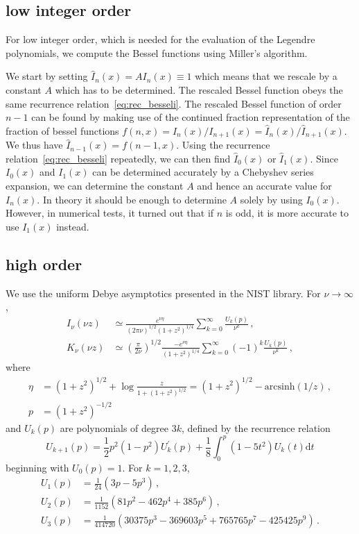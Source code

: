 \documentclass[onecolumn%
              ,superscriptaddress%
              ,aps%
              ,pra]{revtex4}
\begin{document}
\subsection{low integer order}
For low integer order, which is needed for the evaluation of the Legendre polynomials, we compute the Bessel functions using Miller's algorithm.

We start by setting $\hat{I}_n(x)=A I_n(x)\equiv 1$ which means that we rescale by a constant $A$ which has to be determined. The rescaled Bessel function obeys the same recurrence relation~\eqref{eq:rec_besseli}. The rescaled Bessel function of order $n-1$ can be found by making use of the continued fraction representation of the fraction of bessel functions $f(n,x)=I_n(x)/I_{n+1}(x)=\hat{I}_n(x)/\hat{I}_{n+1}(x)$. We thus have $\hat{I}_{n-1}(x)=f(n-1,x)$. Using the recurrence relation~\eqref{eq:rec_besseli} repeatedly, we can then find $\hat{I}_0(x)$ or $\hat{I}_1(x)$. Since $I_0(x)$ and $I_1(x)$ can be determined accurately by a Chebyshev series expansion, we can determine the constant $A$ and hence an accurate value for $I_n(x)$. In theory it should be enough to determine $A$ solely by using $I_0(x)$. However, in numerical tests, it turned out that if $n$ is odd, it is more accurate to use $I_1(x)$ instead. 


\subsection{high order}
We use the uniform Debye asymptotics presented in the NIST library. For $\nu\rightarrow\infty$,
\begin{align}
I_\nu(\nu z) &\simeq \frac{e^{\nu \eta}}{(2\pi\nu)^{1/2}(1+z^2)^{1/4}} \sum_{k=0}^\infty \frac{U_k(p)}{\nu^k}\,, \\
K_\nu(\nu z) &\simeq \left(\frac{\pi}{2\nu}\right)^{1/2}\frac{-e^{\nu \eta}}{(1+z^2)^{1/4}} \sum_{k=0}^\infty (-1)^k \frac{U_k(p)}{\nu^k}\,,
\end{align}
where
\begin{align}
\eta &= (1+z^2)^{1/2} + \log\frac{z}{1+(1+z^2)^{1/2}} = (1+z^2)^{1/2} - \mathrm{arcsinh}(1/z)\,, \\
p & = (1+z^2)^{-1/2}
\end{align}
and $U_k(p)$ are polynomials of degree $3k$, defined by the recurrence relation
\begin{equation}
U_{k+1}(p) = \frac{1}{2}p^2(1-p^2) U_k^\prime(p) + \frac{1}{8}\int_0^p (1-5t^2) U_k(t)\mathrm{d}t
\end{equation}
beginning with $U_0(p)=1$. For $k=1,2,3$,
\begin{equation}
\begin{aligned}
U_1(p) &= \frac{1}{24}(3p-5p^3)\,, \\
U_2(p) &= \frac{1}{1152}(81p^2-462p^4+385p^6)\,, \\
U_3(p) &= \frac{1}{414720}(30375p^3-369603p^5+765765p^7 - 425425 p^9)\,. \\
\end{aligned}
\end{equation}
\end{document}
